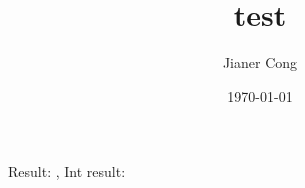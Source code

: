 \documentclass{article}
\title{test}
\author{Jianer Cong}
\date{\today}
\begin{document}
  \def\myget#1.#2{#1}         %
  Result: \pgfmathresult{}, Int result:
  \expandafter\myget\pgfmathresult{}
  
\end{document}

